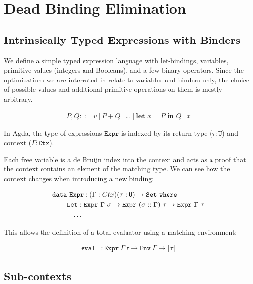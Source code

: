 \documentclass[sigplan,nonacm,screen]{acmart}
\newcommand{\I}[1]{\texttt{#1}\xspace}
\newcommand{\K}[1]{\textbf{\texttt{#1}}\xspace}
\newcommand{\Interpret}[1]{\llbracket #1 \rrbracket\xspace}
\begin{document}
\section{Dead Binding Elimination}

\subsection{Intrinsically Typed Expressions with Binders}

We define a simple typed expression language with let-bindings,
variables, primitive values (integers and Booleans), and a few binary operators.
Since the optimisations we are interested in relate to variables and binders only,
the choice of possible values and additional primitive operations on them is mostly arbitrary.

\begin{align*}
  P, Q ::= v
  \ \big|\  P + Q
  \ \big|\  \ldots
  \ \big|\  \textbf{let } x = P \textbf{ in } Q
  \ \big|\  x
\end{align*}

In Agda, the type of expressions $\I{Expr}$ is indexed by its return type ($\tau : \I{U}$)
and context ($\Gamma : \I{Ctx}$).

Each free variable is a de Bruijn index into the context and acts as a proof that
the context contains an element of the matching type.
We can see how the context changes when introducing a new binding:

\begin{align*}
  \K{data}\ \I{Expr}& : (\Gamma : Ctx) (\tau : \I{U}) \to \I{Set}\ \K{where} \\
  \I{Let}
    :\ &\I{Expr}\ \Gamma\ \sigma \to
        \I{Expr}\ (\sigma :: \Gamma)\ \tau \to
        \I{Expr}\ \Gamma\ \tau  \\
    \ldots\ &
\end{align*}

This allows the definition of a total evaluator
using a matching environment:

\begin{align*}
  \I{eval} &: \I{Expr}\ \Gamma\ \tau \to \I{Env}\ \Gamma \to \Interpret{\tau}
\end{align*}

\subsection{Sub-contexts}

\end{document}
